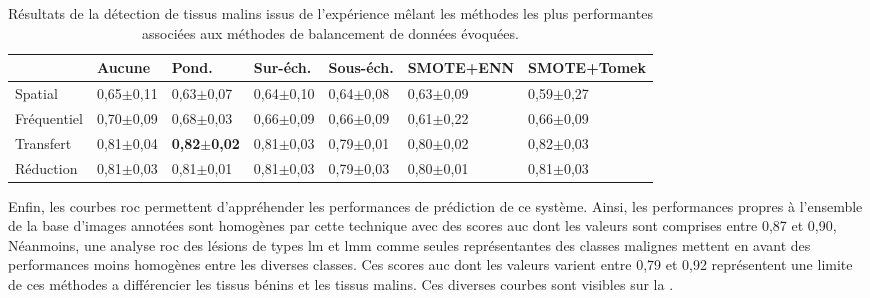 \begin{table}[H]
    \begin{tabular}{lllllll}
        \toprule
                    & Aucune        & Pond.                 & Sur-éch.      & Sous-éch.     & SMOTE+ENN     & SMOTE+Tomek   \\ \hline
        Spatial     & 0,65$\pm$0,11 & 0,63$\pm$0,07         & 0,64$\pm$0,10 & 0,64$\pm$0,08 & 0,63$\pm$0,09 & 0,59$\pm$0,27 \\
        Fréquentiel & 0,70$\pm$0,09 & 0,68$\pm$0,03         & 0,66$\pm$0,09 & 0,66$\pm$0,09 & 0,61$\pm$0,22 & 0,66$\pm$0,09 \\ \rowcolor[HTML]{E7E6E6} 
        Transfert   & 0,81$\pm$0,04 & \textbf{0,82$\pm$0,02}& 0,81$\pm$0,03 & 0,79$\pm$0,01 & 0,80$\pm$0,02 & 0,82$\pm$0,03 \\
        Réduction   & 0,81$\pm$0,03 & 0,81$\pm$0,01         & 0,81$\pm$0,03 & 0,79$\pm$0,03 & 0,80$\pm$0,01 & 0,81$\pm$0,03 \\ \bottomrule 
    \end{tabular}
    \caption{Résultats de la détection de tissus malins issus de l'expérience mêlant les méthodes les plus performantes associées aux méthodes de balancement de données évoquées.}
    \label{tab:results_balancement_malignant}
\end{table}\par

Enfin, les courbes \gls{roc} permettent d'appréhender les performances de prédiction de ce système. Ainsi, les performances propres à l'ensemble de la base d'images annotées sont homogènes par cette technique avec des scores \gls{auc} dont les valeurs sont comprises entre 0,87 et 0,90, Néanmoins, une analyse \gls{roc} des lésions de types \gls{lm} et \gls{lmm} comme seules représentantes des classes malignes mettent en avant des performances moins homogènes entre les diverses classes. Ces scores \gls{auc} dont les valeurs varient entre 0,79 et 0,92 représentent une limite de ces méthodes a différencier les tissus bénins et les tissus malins. Ces diverses courbes sont visibles sur la .\par

